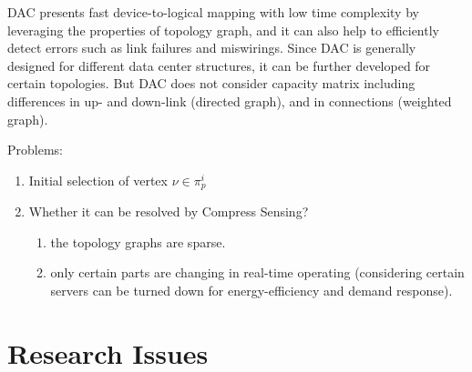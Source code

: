 \documentclass[journal,onecolumn,11pt]{IEEEtran}
\begin{document}
DAC \cite{Chen:2010:GAA:1851182.1851190} presents fast device-to-logical mapping with low time complexity by leveraging the properties of topology graph, and it can also help to efficiently detect errors such as link failures and miswirings. Since DAC is generally designed for different data center structures, it can be further developed for certain topologies. But DAC does not consider capacity matrix including differences in up- and down-link (directed graph), and in connections (weighted graph).


Problems:
\begin{enumerate}
  \item Initial selection of vertex $\nu\in\pi_p^i$
  \item Whether it can be resolved by Compress Sensing?
  \begin{enumerate}
    \item the topology graphs are sparse.
    \item only certain parts are changing in real-time operating (considering certain servers can be turned down for energy-efficiency and demand response).
  \end{enumerate}
\end{enumerate}

\section{Research Issues}
\end{document}
